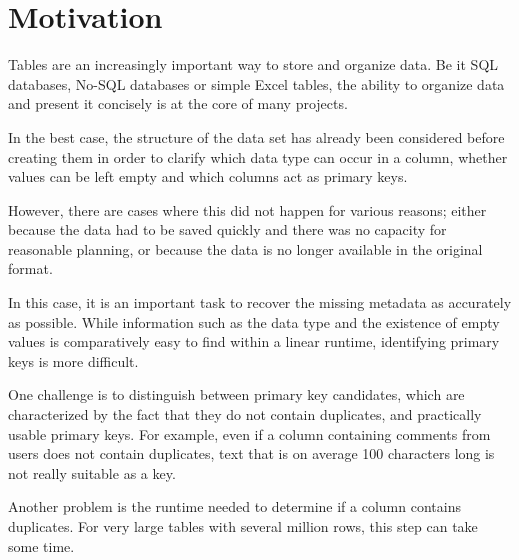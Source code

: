 \chapter{Motivation}
Tables are an increasingly important way to store and organize data. Be it SQL databases, No-SQL databases or simple Excel tables, the ability to organize data and present it concisely is at the core of many projects.

In the best case, the structure of the data set has already been considered before creating them in order to clarify which data type can occur in a column, whether values can be left empty and which columns act as primary keys.

However, there are cases where this did not happen for various reasons; either because the data had to be saved quickly and there was no capacity for reasonable planning, or because the data is no longer available in the original format. %

In this case, it is an important task to recover the missing metadata as accurately as possible. While information such as the data type and the existence of empty values is comparatively easy to find within a linear runtime, identifying primary keys is more difficult.

One challenge is to distinguish between primary key candidates, which are characterized by the fact that they do not contain duplicates, and practically usable primary keys. %
For example, even if a column containing comments from users does not contain duplicates, text that is on average 100 characters long is not really suitable as a key.

Another problem is the runtime needed to determine if a column contains duplicates. For very large tables with several million rows, this step can take some time. %
